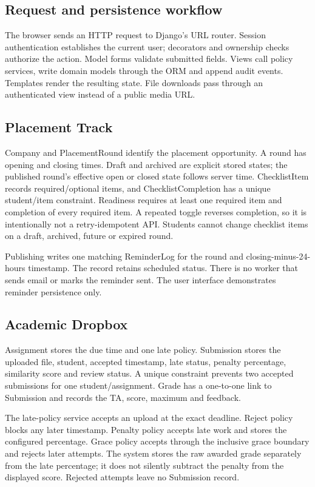 \documentclass[11pt,a4paper]{article}
\begin{document}
\subsection{Request and persistence workflow}
The browser sends an HTTP request to Django's URL router. Session authentication establishes the current user; decorators and ownership checks authorize the action. Model forms validate submitted fields. Views call policy services, write domain models through the ORM and append audit events. Templates render the resulting state. File downloads pass through an authenticated view instead of a public media URL.

\subsection{Placement Track}
Company and PlacementRound identify the placement opportunity. A round has opening and closing times. Draft and archived are explicit stored states; the published round's effective open or closed state follows server time. ChecklistItem records required/optional items, and ChecklistCompletion has a unique student/item constraint. Readiness requires at least one required item and completion of every required item. A repeated toggle reverses completion, so it is intentionally not a retry-idempotent API. Students cannot change checklist items on a draft, archived, future or expired round.

Publishing writes one matching ReminderLog for the round and closing-minus-24-hours timestamp. The record retains scheduled status. There is no worker that sends email or marks the reminder sent. The user interface demonstrates reminder persistence only.

\subsection{Academic Dropbox}
Assignment stores the due time and one late policy. Submission stores the uploaded file, student, accepted timestamp, late status, penalty percentage, similarity score and review status. A unique constraint prevents two accepted submissions for one student/assignment. Grade has a one-to-one link to Submission and records the TA, score, maximum and feedback.

The late-policy service accepts an upload at the exact deadline. Reject policy blocks any later timestamp. Penalty policy accepts late work and stores the configured percentage. Grace policy accepts through the inclusive grace boundary and rejects later attempts. The system stores the raw awarded grade separately from the late percentage; it does not silently subtract the penalty from the displayed score. Rejected attempts leave no Submission record.
\end{document}
